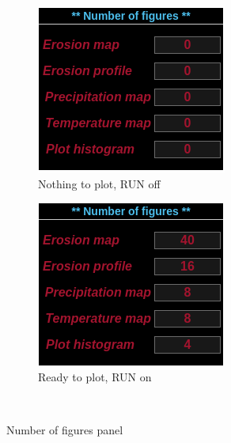 \documentclass[11pt,a4paper,titlepage]{report}
\begin{document}
\begin{figure}[H]
    \centering
    \begin{subfigure}[H]{0.20\textwidth}
        \includegraphics[width=\textwidth]{nfigures1.png}
        \caption{Nothing to plot, RUN off}
        \label{fig:nfigures0}
    \end{subfigure}
    \quad
    \begin{subfigure}[H]{0.20\textwidth}
        \includegraphics[width=\textwidth]{nfigures2.png}
        \caption{Ready to plot, RUN on}
        \label{fig:nfigures1}
    \end{subfigure}\\
    \caption[Number of figures panel]{Number of figures panel}
    \label{fig:nfigures}    
\end{figure}
\end{document}
